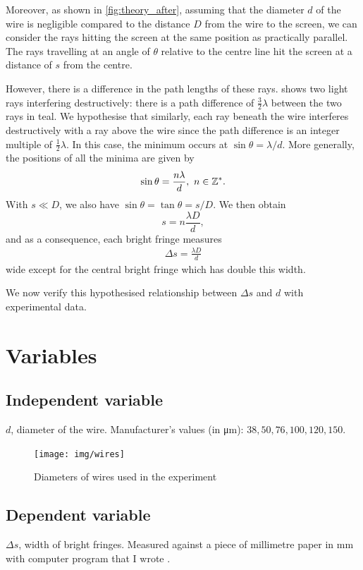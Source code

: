 \documentclass[a4paper, 12pt]{article}
\begin{document}
Moreover, as shown in \cref{fig:theory_after}, assuming that the diameter $d$ of the wire is negligible compared to the distance $D$ from the wire to the screen, we can consider the rays hitting the screen at the same position as practically parallel. 
The rays travelling at an angle of $\theta$ relative to the centre line hit the screen at a distance of $s$ from the centre.

However, there is a difference in the path lengths of these rays.  shows two light rays interfering destructively: 
there is a path difference of $\frac{3}{2}\lambda$ between the two rays in teal.
We hypothesise that similarly, each ray beneath the wire interferes destructively with a ray above the wire since the path difference is an integer multiple of $\frac{1}{2}\lambda$.
In this case, the minimum occurs at $\sin\theta = \lambda / d$.
More generally, the positions of all the minima are given by
\[\sin\theta = \frac{n \lambda}{d},\ n \in \mathbb{Z}^*.\]
With $s \ll D$, we also have $\sin\theta = \tan\theta = s / D$. 
We then obtain
\[
s = n \frac{\lambda D}{d},
\]
and as a consequence, each bright fringe measures
\begin{align}
    \Delta s = \frac{\lambda D}{d}\label{eq:hypothesis}
\end{align}
wide except for the central bright fringe which has double this width.

We now verify this hypothesised relationship between $\Delta s$ and $d$ with experimental data.

\section{Variables}
\subsection*{Independent variable}
$d$, diameter of the wire. Manufacturer's values (in \si{\um}): $38, 50, 76, 100, 120, 150$.
\begin{figure}[H]
    \centering
    \texttt{[image: img/wires]}
    \caption{Diameters of wires used in the experiment}
    \label{fig:wires}
\end{figure}

\subsection*{Dependent variable}
$\Delta s$, width of bright fringes. Measured against a piece of millimetre paper in \si{\mm} with computer program that I wrote \autocite{py_extract}.
\end{document}
